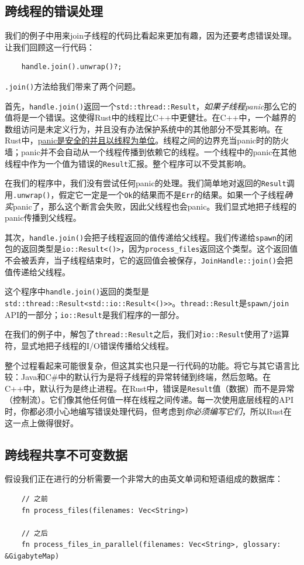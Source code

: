 \subsection{跨线程的错误处理}
我们的例子中用来join子线程的代码比看起来更加有趣，因为还要考虑错误处理。让我们回顾这一行代码：
\begin{verbatim}
    handle.join().unwrap()?;
\end{verbatim}

\texttt{.join()}方法给我们带来了两个问题。

首先，\texttt{handle.join()}返回一个\texttt{std::thread::Result}，\emph{如果子线程panic}那么它的值将是一个错误。这使得Rust中的线程比C++中更健壮。在C++中，一个越界的数组访问是未定义行为，并且没有办法保护系统中的其他部分不受其影响。在Rust中，\hyperref[unwind]{panic是安全的并且以线程为单位}。线程之间的边界充当panic时的防火墙；panic并不会自动从一个线程传播到依赖它的线程。一个线程中的panic在其他线程中作为一个值为错误的\texttt{Result}汇报。整个程序可以不受其影响。

在我们的程序中，我们没有尝试任何panic的处理。我们简单地对返回的\texttt{Result}调用\texttt{.unwrap()}，假定它一定是一个\texttt{Ok}的结果而不是\texttt{Err}的结果。如果一个子线程\emph{确实}panic了，那么这个断言会失败，因此父线程也会panic。我们显式地把子线程的panic传播到父线程。

其次，\texttt{handle.join()}会把子线程返回的值传递给父线程。我们传递给\texttt{spawn}的闭包的返回类型是\texttt{io::Result<()>}，因为\texttt{process\_files}返回这个类型。这个返回值不会被丢弃，当子线程结束时，它的返回值会被保存，\texttt{JoinHandle::join()}会把值传递给父线程。

这个程序中\texttt{handle.join()}返回的类型是\texttt{std::thread::Result<std::io::Result<()>>}。\texttt{thread::Result}是\texttt{spawn/join} API的一部分；\texttt{io::Result}是我们程序的一部分。

在我们的例子中，解包了\texttt{thread::Result}之后，我们对\texttt{io::Result}使用了\texttt{?}运算符，显式地把子线程的I/O错误传播给父线程。

整个过程看起来可能很复杂，但这其实也只是一行代码的功能。将它与其它语言比较：Java和C\#中的默认行为是将子线程的异常转储到终端，然后忽略。在C++中，默认行为是终止进程。在Rust中，错误是\texttt{Result}值（数据）而不是异常（控制流）。它们像其他任何值一样在线程之间传递。每一次使用底层线程的API时，你都必须小心地编写错误处理代码，但考虑到\emph{你必须编写它们}，所以Rust在这一点上做得很好。

\subsection{跨线程共享不可变数据}
假设我们正在进行的分析需要一个非常大的由英文单词和短语组成的数据库：
\begin{verbatim}
    // 之前
    fn process_files(filenames: Vec<String>)

    // 之后
    fn process_files_in_parallel(filenames: Vec<String>, glossary: &GigabyteMap)
\end{verbatim}

